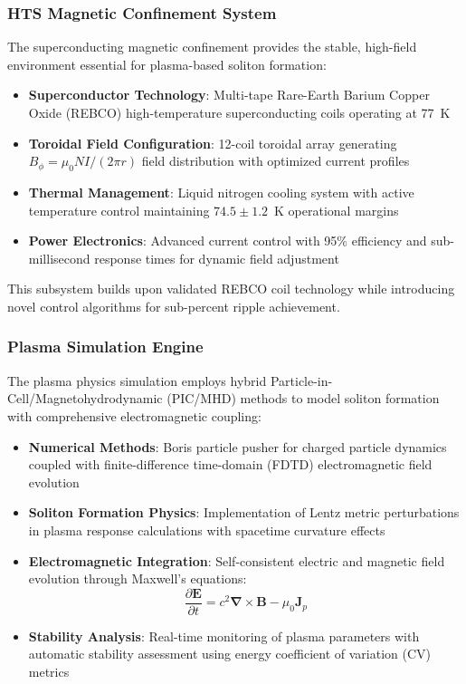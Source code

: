 \documentclass[12pt,a4paper]{article}
\newcommand{\ddt}[1]{\frac{\partial #1}{\partial t}}
\newcommand{\curl}{\boldsymbol{\nabla} \times}
\begin{document}
\subsubsection{HTS Magnetic Confinement System}

The superconducting magnetic confinement provides the stable, high-field environment essential for plasma-based soliton formation:

\begin{itemize}
\item \textbf{Superconductor Technology}: Multi-tape Rare-Earth Barium Copper Oxide (REBCO) high-temperature superconducting coils operating at 77~K
\item \textbf{Toroidal Field Configuration}: 12-coil toroidal array generating $B_\phi = \mu_0 NI/(2\pi r)$ field distribution with optimized current profiles
\item \textbf{Thermal Management}: Liquid nitrogen cooling system with active temperature control maintaining $74.5 \pm 1.2$~K operational margins
\item \textbf{Power Electronics}: Advanced current control with 95\% efficiency and sub-millisecond response times for dynamic field adjustment
\end{itemize}

This subsystem builds upon validated REBCO coil technology \cite{HTS2024} while introducing novel control algorithms for sub-percent ripple achievement.

\subsubsection{Plasma Simulation Engine}

The plasma physics simulation employs hybrid Particle-in-Cell/Magnetohydrodynamic (PIC/MHD) methods to model soliton formation with comprehensive electromagnetic coupling:

\begin{itemize}
\item \textbf{Numerical Methods}: Boris particle pusher for charged particle dynamics coupled with finite-difference time-domain (FDTD) electromagnetic field evolution
\item \textbf{Soliton Formation Physics}: Implementation of Lentz metric perturbations in plasma response calculations with spacetime curvature effects
\item \textbf{Electromagnetic Integration}: Self-consistent electric and magnetic field evolution through Maxwell's equations: 
\begin{equation}
\ddt{\mathbf{E}} = c^2 \curl \mathbf{B} - \mu_0 \mathbf{J}_p
\end{equation}
\item \textbf{Stability Analysis}: Real-time monitoring of plasma parameters with automatic stability assessment using energy coefficient of variation (CV) metrics
\end{itemize}
\end{document}
